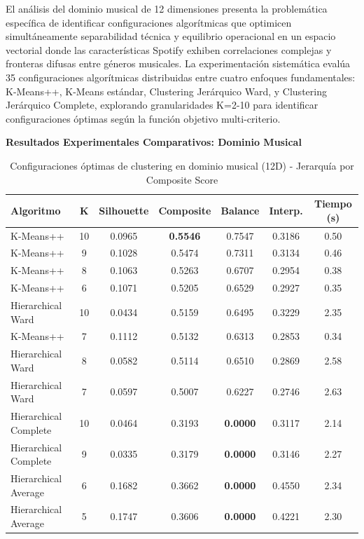 \documentclass[12pt,a4paper]{report}
\begin{document}
El análisis del dominio musical de 12 dimensiones presenta la problemática específica de identificar configuraciones algorítmicas que optimicen simultáneamente separabilidad técnica y equilibrio operacional en un espacio vectorial donde las características Spotify exhiben correlaciones complejas y fronteras difusas entre géneros musicales. La experimentación sistemática evalúa 35 configuraciones algorítmicas distribuidas entre cuatro enfoques fundamentales: K-Means++, K-Means estándar, Clustering Jerárquico Ward, y Clustering Jerárquico Complete, explorando granularidades K=2-10 para identificar configuraciones óptimas según la función objetivo multi-criterio.

\textbf{Resultados Experimentales Comparativos: Dominio Musical}

\begin{table}[h]
\centering
\caption{Configuraciones óptimas de clustering en dominio musical (12D) - Jerarquía por Composite Score}
\label{tab:musical_comparison}
\begin{tabular}{|l|c|c|c|c|c|c|}
\hline
\textbf{Algoritmo} & \textbf{K} & \textbf{Silhouette} & \textbf{Composite} & \textbf{Balance} & \textbf{Interp.} & \textbf{Tiempo (s)} \\
\hline
\rowcolor{lightgray}
K-Means++ & 10 & 0.0965 & \textbf{0.5546} & 0.7547 & 0.3186 & 0.50 \\
K-Means++ & 9 & 0.1028 & 0.5474 & 0.7311 & 0.3134 & 0.46 \\
K-Means++ & 8 & 0.1063 & 0.5263 & 0.6707 & 0.2954 & 0.38 \\
K-Means++ & 6 & 0.1071 & 0.5205 & 0.6529 & 0.2927 & 0.35 \\
Hierarchical Ward & 10 & 0.0434 & 0.5159 & 0.6495 & 0.3229 & 2.35 \\
K-Means++ & 7 & 0.1112 & 0.5132 & 0.6313 & 0.2853 & 0.34 \\
Hierarchical Ward & 8 & 0.0582 & 0.5114 & 0.6510 & 0.2869 & 2.58 \\
Hierarchical Ward & 7 & 0.0597 & 0.5007 & 0.6227 & 0.2746 & 2.63 \\
\hline
Hierarchical Complete & 10 & 0.0464 & 0.3193 & \textbf{0.0000} & 0.3117 & 2.14 \\
Hierarchical Complete & 9 & 0.0335 & 0.3179 & \textbf{0.0000} & 0.3146 & 2.27 \\
Hierarchical Average & 6 & 0.1682 & 0.3662 & \textbf{0.0000} & 0.4550 & 2.34 \\
Hierarchical Average & 5 & 0.1747 & 0.3606 & \textbf{0.0000} & 0.4221 & 2.30 \\
\hline
\end{tabular}
\end{table}
\end{document}
